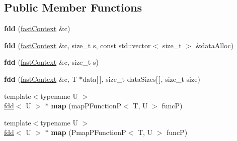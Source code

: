 \subsection*{Public Member Functions}
\begin{DoxyCompactItemize}
\item 
\hypertarget{classfaster_1_1fdd_3_01T_01_5_01_4_a5e4ef770313ef0061b7039102463d1bb}{}{\bfseries fdd} (\hyperlink{classfaster_1_1fastContext}{fast\+Context} \&c)\label{classfaster_1_1fdd_3_01T_01_5_01_4_a5e4ef770313ef0061b7039102463d1bb}

\item 
\hypertarget{classfaster_1_1fdd_3_01T_01_5_01_4_aeff7da6018786d1e58fefc80a04e0f41}{}{\bfseries fdd} (\hyperlink{classfaster_1_1fastContext}{fast\+Context} \&c, size\+\_\+t s, const std\+::vector$<$ size\+\_\+t $>$ \&data\+Alloc)\label{classfaster_1_1fdd_3_01T_01_5_01_4_aeff7da6018786d1e58fefc80a04e0f41}

\item 
\hypertarget{classfaster_1_1fdd_3_01T_01_5_01_4_aeece4f42b6eff6fef26a0c0fe9fc88fa}{}{\bfseries fdd} (\hyperlink{classfaster_1_1fastContext}{fast\+Context} \&c, size\+\_\+t s)\label{classfaster_1_1fdd_3_01T_01_5_01_4_aeece4f42b6eff6fef26a0c0fe9fc88fa}

\item 
\hypertarget{classfaster_1_1fdd_3_01T_01_5_01_4_ab844e7f258c74838fb468214325b50d6}{}{\bfseries fdd} (\hyperlink{classfaster_1_1fastContext}{fast\+Context} \&c, T $\ast$data\mbox{[}$\,$\mbox{]}, size\+\_\+t data\+Sizes\mbox{[}$\,$\mbox{]}, size\+\_\+t size)\label{classfaster_1_1fdd_3_01T_01_5_01_4_ab844e7f258c74838fb468214325b50d6}

\item 
\hypertarget{classfaster_1_1fdd_3_01T_01_5_01_4_ad3d34fd674c74c0d78b771c8b66c1597}{}{\footnotesize template$<$typename U $>$ }\\\hyperlink{classfaster_1_1fdd}{fdd}$<$ U $>$ $\ast$ {\bfseries map} (map\+P\+Function\+P$<$ T, U $>$ func\+P)\label{classfaster_1_1fdd_3_01T_01_5_01_4_ad3d34fd674c74c0d78b771c8b66c1597}

\item 
\hypertarget{classfaster_1_1fdd_3_01T_01_5_01_4_a7c80a0dbb77a88c1c6158c8516b4c698}{}{\footnotesize template$<$typename U $>$ }\\\hyperlink{classfaster_1_1fdd}{fdd}$<$ U $>$ $\ast$ {\bfseries map} (Pmap\+P\+Function\+P$<$ T, U $>$ func\+P)\label{classfaster_1_1fdd_3_01T_01_5_01_4_a7c80a0dbb77a88c1c6158c8516b4c698}


\end{DoxyCompactItemize}
